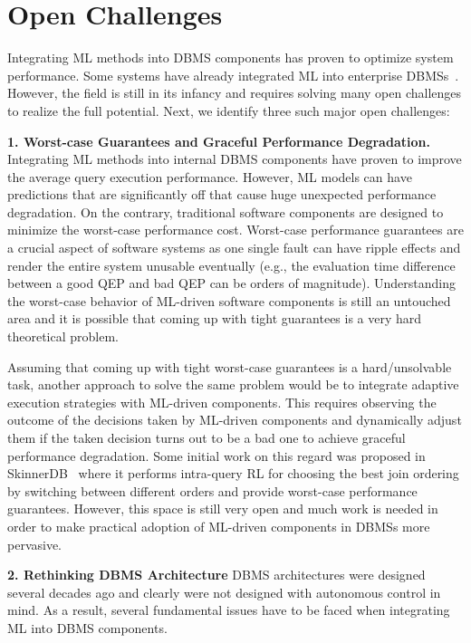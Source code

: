 \section{Open Challenges}
Integrating ML methods into DBMS components has proven to optimize system performance.
Some systems have already integrated ML into enterprise DBMSs~\cite{leo, cardlearner, verdict}.
However, the field is still in its infancy and requires solving many open challenges to realize the full potential.
Next, we identify three such major open challenges:


\vspace{2mm}
\noindent \textbf{1. Worst-case Guarantees and Graceful Performance Degradation.} Integrating ML methods into internal DBMS components have proven to improve the average query execution performance.
However, ML models can have predictions that are significantly off that cause huge unexpected performance degradation.
On the contrary, traditional software components are designed to minimize the worst-case performance cost.
Worst-case performance guarantees are a crucial aspect of software systems as one single fault can have ripple effects and render the entire system unusable eventually (e.g., the evaluation time difference between a good QEP and bad QEP can be orders of magnitude).
Understanding the worst-case behavior of ML-driven software components is still an untouched area and it is possible that coming up with tight guarantees is a very hard theoretical problem.

Assuming that coming up with tight worst-case guarantees is a hard/unsolvable task, another approach to solve the same problem would be to integrate adaptive execution strategies with ML-driven components.
This requires observing the outcome of the decisions taken by ML-driven components and dynamically adjust them if the taken decision turns out to be a bad one to achieve graceful performance degradation.
Some initial work on this regard was proposed in SkinnerDB~\cite{skinnerdb} where it performs intra-query RL for choosing the best join ordering by switching between different orders and provide worst-case performance guarantees.
However, this space is still very open and much work is needed in order to make practical adoption of ML-driven components in DBMSs more pervasive.


\vspace{2mm}
\noindent \textbf{2. Rethinking DBMS Architecture} DBMS architectures were designed several decades ago and clearly were not designed with autonomous control in mind.
As a result, several fundamental issues have to be faced when integrating ML into DBMS components.

